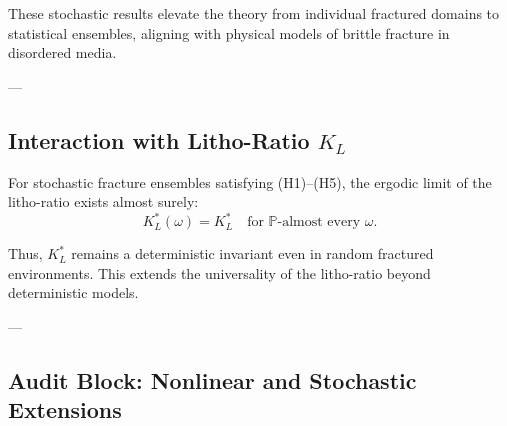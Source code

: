 \begin{remark}
These stochastic results elevate the theory from individual fractured domains 
to statistical ensembles,  
aligning with physical models of brittle fracture in disordered media.
\end{remark}

---

\subsection{Interaction with Litho-Ratio $K_L$}

\begin{theorem}
\label{thm:KL-stochastic}
For stochastic fracture ensembles satisfying (H1)--(H5),  
the ergodic limit of the litho-ratio exists almost surely:
\[
K_L^*(\omega) = K_L^* \quad \text{for $\mathbb{P}$-almost every $\omega$}.
\]
\end{theorem}

\begin{remark}
Thus, $K_L^*$ remains a deterministic invariant even in random fractured environments.  
This extends the universality of the litho-ratio beyond deterministic models.
\end{remark}

---

\subsection{Audit Block: Nonlinear and Stochastic Extensions}

